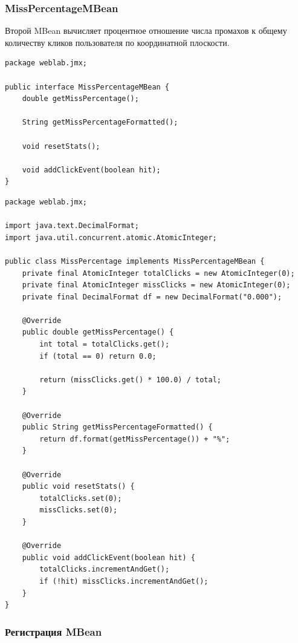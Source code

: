 \subsubsection{MissPercentageMBean}

Второй MBean вычисляет процентное отношение числа промахов к общему количеству кликов пользователя по координатной плоскости.

\begin{lstlisting}[caption=Листинг интерфейса \texttt{MissPercentageMBean}.]
package weblab.jmx;

public interface MissPercentageMBean {
    double getMissPercentage();

    String getMissPercentageFormatted();

    void resetStats();

    void addClickEvent(boolean hit);
}
\end{lstlisting}

\begin{lstlisting}[caption=Листинг реализации \texttt{MissPercentage}.]
package weblab.jmx;

import java.text.DecimalFormat;
import java.util.concurrent.atomic.AtomicInteger;

public class MissPercentage implements MissPercentageMBean {
    private final AtomicInteger totalClicks = new AtomicInteger(0);
    private final AtomicInteger missClicks = new AtomicInteger(0);
    private final DecimalFormat df = new DecimalFormat("0.000");

    @Override
    public double getMissPercentage() {
        int total = totalClicks.get();
        if (total == 0) return 0.0;

        return (missClicks.get() * 100.0) / total;
    }

    @Override
    public String getMissPercentageFormatted() {
        return df.format(getMissPercentage()) + "%";
    }

    @Override
    public void resetStats() {
        totalClicks.set(0);
        missClicks.set(0);
    }

    @Override
    public void addClickEvent(boolean hit) {
        totalClicks.incrementAndGet();
        if (!hit) missClicks.incrementAndGet();
    }
}
\end{lstlisting}

\subsubsection{Регистрация MBean}

